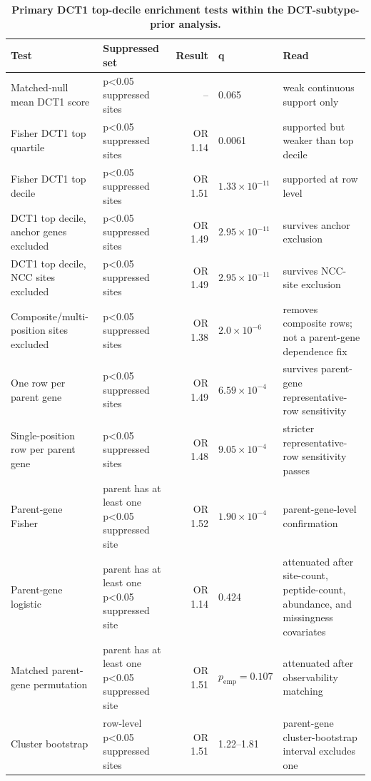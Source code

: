 \documentclass[10pt]{article}
\begin{document}
\begin{table}[H]
\centering\small
\caption{\textbf{Primary DCT1 top-decile enrichment tests within the DCT-subtype-prior analysis.}}
\label{tab:h2primary}
\begin{tabularx}{\textwidth}{p{}p{}rlX}
\toprule
Test & Suppressed set & Result & q & Read \\
\midrule
Matched-null mean DCT1 score & p<0.05 suppressed sites & -- & 0.065 & weak continuous support only \\
Fisher DCT1 top quartile & p<0.05 suppressed sites & OR 1.14 & 0.0061 & supported but weaker than top decile \\
Fisher DCT1 top decile & p<0.05 suppressed sites & OR 1.51 & $1.33\times10^{-11}$ & supported at row level \\
DCT1 top decile, anchor genes excluded & p<0.05 suppressed sites & OR 1.49 & $2.95\times10^{-11}$ & survives anchor exclusion \\
DCT1 top decile, NCC sites excluded & p<0.05 suppressed sites & OR 1.49 & $2.95\times10^{-11}$ & survives NCC-site exclusion \\
Composite/multi-position sites excluded & p<0.05 suppressed sites & OR 1.38 & $2.0\times10^{-6}$ & removes composite rows; not a parent-gene dependence fix \\
One row per parent gene & p<0.05 suppressed sites & OR 1.49 & $6.59\times10^{-4}$ & survives parent-gene representative-row sensitivity \\
Single-position row per parent gene & p<0.05 suppressed sites & OR 1.48 & $9.05\times10^{-4}$ & stricter representative-row sensitivity passes \\
Parent-gene Fisher & parent has at least one p<0.05 suppressed site & OR 1.52 & $1.90\times10^{-4}$ & parent-gene-level confirmation \\
Parent-gene logistic & parent has at least one p<0.05 suppressed site & OR 1.14 & 0.424 & attenuated after site-count, peptide-count, abundance, and missingness covariates \\
Matched parent-gene permutation & parent has at least one p<0.05 suppressed site & OR 1.51 & $p_{\mathrm{emp}}=0.107$ & attenuated after observability matching \\
Cluster bootstrap & row-level p<0.05 suppressed sites & OR 1.51 & 1.22--1.81 & parent-gene cluster-bootstrap interval excludes one \\
\bottomrule
\end{tabularx}
\end{table}
\end{document}
